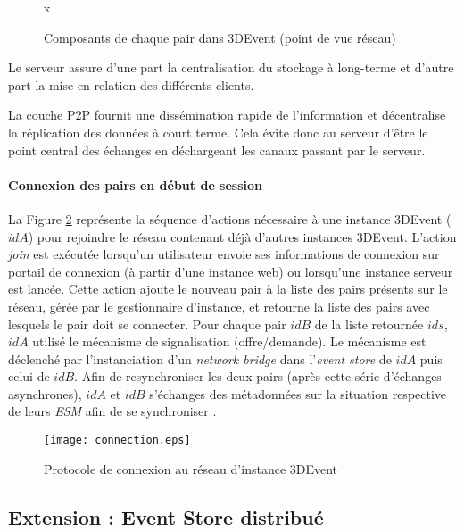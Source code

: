 \begin{figure}[ht]
	\centering
x	\caption{Composants de chaque pair dans 3DEvent (point de vue réseau)}
	\label{fig:middleware}
\end{figure}

Le serveur assure d'une part la centralisation du stockage à long-terme et d'autre 
part la mise en relation des différents clients.

La couche \gls{P2P} fournit une dissémination rapide de l'information et 
décentralise la réplication des données à court terme. Cela évite donc au serveur 
d'être le point central des échanges en déchargeant les canaux passant par le 
serveur.

\paragraph{Connexion des pairs en début de session}

La Figure \ref{fig:connexionpairs} représente la séquence d'actions nécessaire à 
une instance 3DEvent ($idA$) pour rejoindre le réseau contenant déjà d'autres 
instances 3DEvent. L'action \textit{join} est exécutée lorsqu'un utilisateur envoie 
ses informations de connexion sur portail de connexion (à partir d'une instance 
web) ou lorsqu'une instance serveur est lancée. Cette action ajoute le nouveau 
pair à la liste des pairs présents sur le réseau, gérée par le gestionnaire 
d'instance, et retourne la liste des pairs avec lesquels le pair doit se connecter. 
Pour chaque pair $idB$ de la liste retournée $ids$, $idA$ utilisé le mécanisme de 
signalisation (offre/demande). Le mécanisme est déclenché par l'instanciation d'un 
\textit{network bridge} dans l'\textit{event store}  de $idA$ 
puis celui de $idB$. Afin de resynchroniser les deux pairs (après cette série 
d'échanges asynchrones), $idA$ et $idB$ s'échanges des métadonnées sur la 
situation respective de leurs \textit{ESM}  afin de se synchroniser 
.

\begin{figure}[t]
	\noindent
	\centering
	\texttt{[image: connection.eps]}
	\caption{Protocole de connexion au réseau d'instance 3DEvent}
	\label{fig:connexionpairs}
\end{figure}

\subsection{Extension : Event Store distribué}

